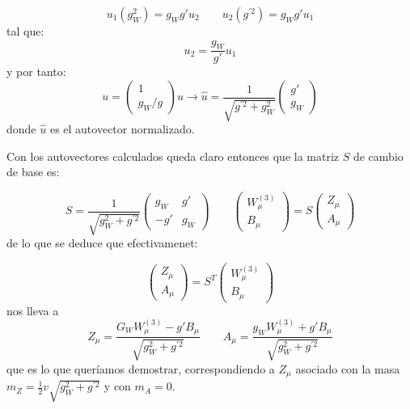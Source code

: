 \begin{itemize}
	\begin{equation}
		u_1 (g_W^2 ) = g_W g' u_2 \qquad 
		u_2 (g^{\prime 2}) = g_W g' u_1  
	\end{equation}
	tal que: 
	\begin{equation}
		u_2 = \frac{g_W}{g'} u_1 
	\end{equation}
	y por tanto: 
	\begin{equation}
		u = \begin{pmatrix}
			1 \\ 
			g_W/g
		\end{pmatrix}u \to \hat{u} = \frac{1}{\sqrt{g^{\prime 2}+g_W^2}} \begin{pmatrix}
			g' \\ 
			g_W 
		\end{pmatrix}
	\end{equation}
	donde $\hat{u}$ es el autovector normalizado. 
\end{itemize}
Con los autovectores calculados queda claro entonces que la matriz $S$ de cambio de base es: 

\begin{equation}
	S = \frac{1}{\sqrt{g_W^2 + g^{\prime 2}}} 
	\begin{pmatrix}	
		g_W &	g' \\ 
		-g' & 	g_W
	\end{pmatrix} \qquad 
	\begin{pmatrix}	
		W^{(3)}_\mu \\
		B_\mu
	\end{pmatrix} = S
	\begin{pmatrix}	
		Z_\mu \\
		A_\mu 
	\end{pmatrix}
\end{equation}
de lo que se deduce que efectivamenet: 

\begin{equation}
	\begin{pmatrix}	
		Z_\mu \\
		A_\mu 
	\end{pmatrix} = S^T
	\begin{pmatrix}	
		W^{(3)}_\mu \\
		B_\mu
	\end{pmatrix}
\end{equation}
nos lleva a 
\begin{equation}
	Z_\mu =\frac{G_W W^{(3)}_\mu - g' B_\mu}{\sqrt{g_W^2 + g^{\prime 2}}}  \qquad A_\mu = \frac{g_WW^{(3)}_\mu +g' B_\mu}{\sqrt{g_W^2 + g^{\prime 2}}}  
\end{equation}
que es lo que queríamos demostrar, correspondiendo a $Z_\mu$ asociado con la masa $m_Z = \frac{1}{2} v \sqrt{g_W^2 + g^{\prime 2}}$ y con $m_A = 0$. 

